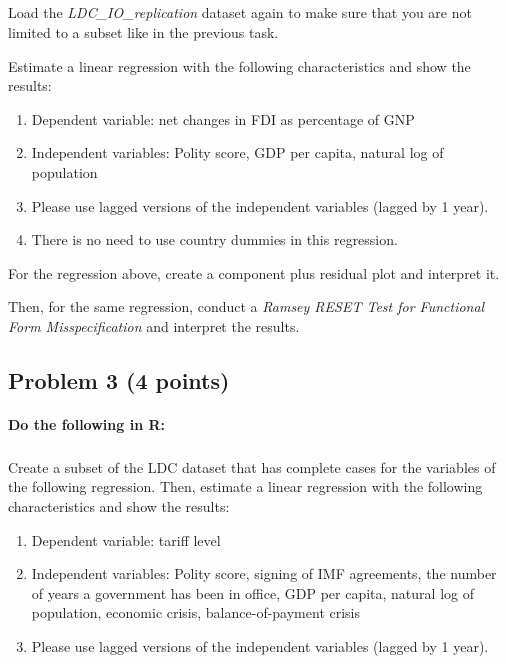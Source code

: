 \documentclass[12pt]{article}
\begin{document}
\subparagraph{} Load the \textit{LDC\_IO\_replication} dataset again to make sure that you are not limited to a subset like in the previous task.

\bigskip

Estimate a linear regression with the following characteristics and show the results:

\begin{enumerate}
	\item Dependent variable: net changes in FDI as percentage of GNP
	\item Independent variables: Polity score, GDP per capita, natural log of population
	\item Please use lagged versions of the independent variables (lagged by 1 year).
	\item There is no need to use country dummies in this regression.
\end{enumerate}

\bigskip

For the regression above, create a component plus residual plot and interpret it.

\bigskip

Then, for the same regression,  conduct a \textit{Ramsey RESET Test for Functional Form Misspecification} and interpret the results.



\subsection*{Problem 3 (4 points)}

\paragraph{Do the following in R:}

\subparagraph{} Create a subset of the LDC dataset that has complete cases for the variables of the following regression. Then, estimate a linear regression with the following characteristics and show the results:

\begin{enumerate}
	\item Dependent variable: tariff level
	\item Independent variables: Polity score, signing of IMF agreements, the number of years a government has been in office, GDP per capita, natural log of population, economic crisis, balance-of-payment crisis
	\item Please use lagged versions of the independent variables (lagged by 1 year).
\end{enumerate}
\end{document}
